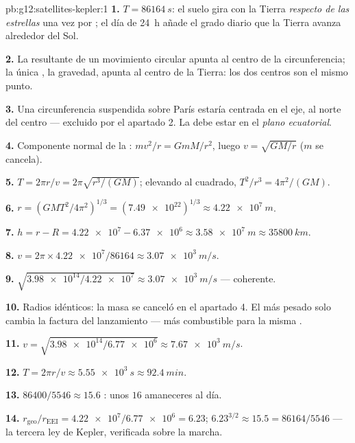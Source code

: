 \begin{solution}{pb:g12:satellites-kepler:1}
\textbf{1.} $T = \qty{86164}{s}$: el suelo gira con la Tierra
\emph{respecto de las estrellas} una vez por ; el día de
\qty{24}{h} añade el grado diario que la Tierra avanza alrededor del
Sol.

\textbf{2.} La  resultante de un movimiento circular apunta al
centro de la circunferencia; la única , la gravedad, apunta al
centro de la Tierra: los dos centros son el mismo punto.

\textbf{3.} Una circunferencia suspendida sobre París estaría centrada
en el eje, al norte del centro --- excluido por el apartado 2. La 
debe estar en el \emph{plano ecuatorial}.

\textbf{4.} Componente normal de la :
$m v^2/r = GmM/r^2$, luego $v = \sqrt{GM/r}$ ($m$ se cancela).

\textbf{5.} $T = 2\pi r/v = 2\pi\sqrt{r^3/(GM)}$; elevando al cuadrado,
$T^2/r^3 = 4\pi^2/(GM)$.

\textbf{6.} $r = \left(GMT^2/4\pi^2\right)^{1/3} = (\num{7.49e22})^{1/3}
\approx \qty{4.22e7}{m}$.

\textbf{7.} $h = r - R = \num{4.22e7} - \num{6.37e6} \approx
\qty{3.58e7}{m} \approx \qty{35800}{km}$.

\textbf{8.} $v = 2\pi \times \num{4.22e7}/\num{86164} \approx
\qty{3.07e3}{m/s}$.

\textbf{9.} $\sqrt{\num{3.98e14}/\num{4.22e7}} \approx
\qty{3.07e3}{m/s}$ --- coherente.

\textbf{10.} Radios idénticos: la masa se canceló en el apartado 4. El
 más pesado solo cambia la factura del lanzamiento --- más
combustible para la misma .

\textbf{11.} $v = \sqrt{\num{3.98e14}/\num{6.77e6}} \approx
\qty{7.67e3}{m/s}$.

\textbf{12.} $T = 2\pi r/v \approx \qty{5.55e3}{s} \approx
\qty{92.4}{min}$.

\textbf{13.} $\num{86400}/5546 \approx 15.6$ : unos $16$
amaneceres al día.

\textbf{14.} $r_{\text{geo}}/r_{\text{EEI}} = \num{4.22e7}/\num{6.77e6}
= 6.23$; $6.23^{3/2} \approx 15.5 = \num{86164}/5546$ --- la tercera ley
de Kepler, verificada sobre la marcha.


\end{solution}
